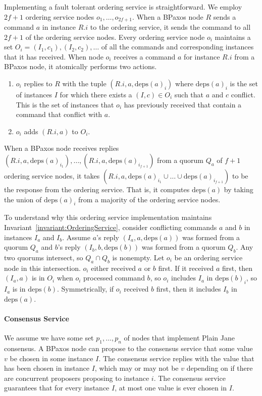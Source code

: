 \documentclass{mwhittaker}
\theoremstyle{definition}
\newcommand{\deps}[1]{\text{deps}(#1)}
\newcommand{\invref}[1]{Invariant~\ref{invariant:#1}}
\begin{document}
Implementing a fault tolerant ordering service is straightforward. We employ
$2f + 1$ ordering service nodes $o_{1}, \ldots, o_{2f + 1}$. When a BPaxos node
$R$ sends a command $a$ in instance $R.i$ to the ordering service, it sends the
command to all $2f + 1$ of the ordering service nodes. Every ordering service
node $o_i$ maintains a set $O_i = {(I_1, c_1), (I_2, c_2), \ldots}$ of all the
commands and corresponding instances that it has received. When node $o_i$
receives a command $a$ for instance $R.i$ from a BPaxos node, it atomically
performs two actions.
\begin{enumerate}
  \item
    $o_i$ replies to $R$ with the tuple $(R.i, a, \deps{a}_i)$ where
    $\deps{a}_i$ is the set of instances $I$ for which there exists a $(I, c)
    \in O_i$ such that $a$ and $c$ conflict. This is the set of instances that
    $o_i$ has previously received that contain a command that conflict with
    $a$.

  \item
    $o_i$ adds $(R.i, a)$ to $O_i$.
\end{enumerate}

When a BPaxos node receives replies $(R.i, a, \deps{a}_{i_1}), \ldots, (R.i, a,
\deps{a}_{i_{f+1}})$ from a quorum $Q_a$ of $f + 1$ ordering service nodes, it
takes $(R.i, a, \deps{a}_{i_1} \cup \ldots \cup \deps{a}_{i_{f+1}})$ to be the
response from the ordering service. That is, it computes $\deps{a}$ by taking
the union of $\deps{a}_i$ from a majority of the ordering service nodes.

To understand why this ordering service implementation maintains
\invref{OrderingService}, consider conflicting commands $a$ and $b$ in
instances $I_a$ and $I_b$. Assume $a$'s reply $(I_a, a, \deps{a})$ was formed
from a quorum $Q_a$ and $b$'s reply $(I_b, b, \deps{b})$ was formed from a
quorum $Q_b$. Any two quorums intersect, so $Q_a \cap Q_b$ is nonempty. Let
$o_i$ be an ordering service node in this intersection. $o_i$ either received
$a$ or $b$ first. If it received $a$ first, then $(I_a, a)$ is in $O_i$ when
$o_i$ processed command $b$, so $o_i$ includes $I_a$ in $\deps{b}_i$, so $I_a$
is in $\deps{b}$.  Symmetrically, if $o_i$ received $b$ first, then it includes
$I_b$ in $\deps{a}$.

\paragraph{Consensus Service}
We assume we have some set $p_1, \ldots, p_n$ of nodes that implement Plain
Jane consensus. A BPaxos node can propose to the consensus service that some
value $v$ be chosen in some instance $I$. The consensus service replies with
the value that has been chosen in instance $I$, which may or may not be $v$
depending on if there are concurrent proposers proposing to instance $i$. The
consensus service guarantees that for every instance $I$, at most one value is
ever chosen in $I$.
\end{document}
